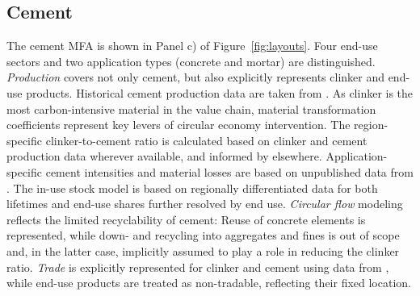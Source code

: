 \documentclass[pdflatex]{sn-jnl}
\begin{document}
\subsection{Cement}\label{sec:cement}
The cement MFA is shown in Panel c) of Figure~\ref{fig:layouts}. Four end-use sectors and two application types (concrete and mortar) are distinguished. \textit{Production} covers not only cement, but also explicitly represents clinker and end-use products. Historical cement production data are taken from \textcite{andrewGlobalCO2Emissions2019a,andrew2026a}. As clinker is the most carbon-intensive material in the value chain, material transformation coefficients represent key levers of circular economy intervention. The region-specific clinker-to-cement ratio is calculated based on clinker and cement production data \parencite{andrewGlobalCO2Emissions2019a,andrew2026a,andrew2026} wherever available, and informed by \textcite{2024a} elsewhere. Application-specific cement intensities and material losses are based on unpublished data from \textcite{kaufmann2024}. The in-use stock model is based on regionally differentiated data for both lifetimes and end-use shares \parencite{kaufmann2024} further resolved by end use. \textit{Circular flow} modeling reflects the limited recyclability of cement: Reuse of concrete elements is represented, while down- and recycling into aggregates and fines is out of scope and, in the latter case, implicitly assumed to play a role in reducing the clinker ratio. \textit{Trade} is explicitly represented for clinker and cement using data from \textcite{gaulier2010}, while end-use products are treated as non-tradable, reflecting their fixed location.
\end{document}
